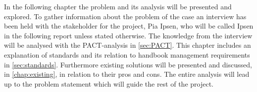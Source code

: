 In the following chapter the problem and its analysis will be presented and explored. 
To gather information about the problem of the case an interview has been held with the stakeholder for the project, Pia Ipsen, who will be called Ipsen in the following report unless stated otherwise.
The knowledge from the interview will be analysed with the PACT-analysis in \cref{sec:PACT}. 
This chapter includes an explanation of standards and its relation to handbook management requirements in \cref{sec:standards}.
Furthermore existing solutions will be presented and discussed, in \cref{chap:existing}, in relation to their pros and cons.
The entire analysis will lead up to the problem statement which will guide the rest of the project.

